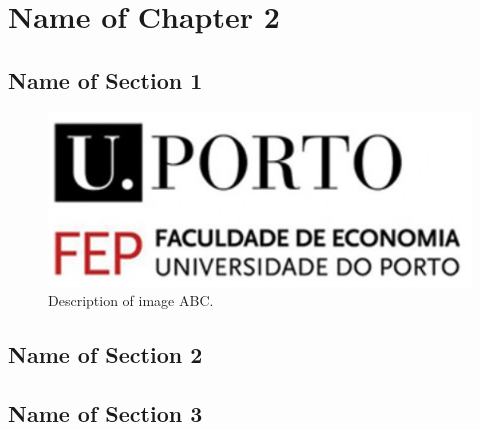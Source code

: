 \chapter{\textbf{Name of Chapter 2}}  

    
    


\section{Name of Section 1}




\begin{figure}[h!]
    \centering
    \includegraphics[scale=0.8]{images/FEP.PNG}
    \caption{Description of image ABC.}
\label{fig: ABC}
\end{figure}




   
  \section{Name of Section 2}   

   





 \section{Name of Section 3}   
 
 


